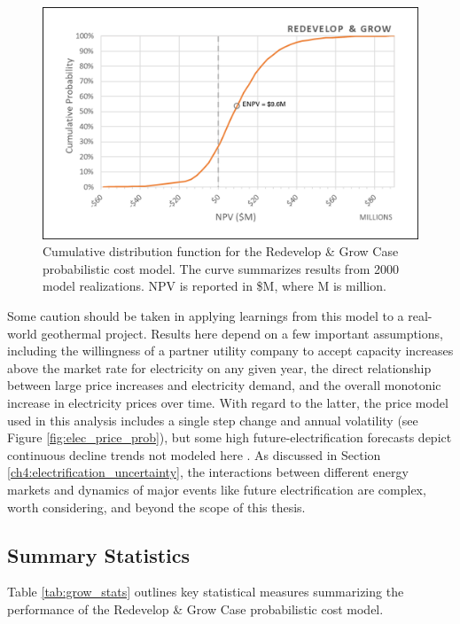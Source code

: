 \begin{figure}[!htp]
\centering
\includegraphics[width=.85\textwidth]{templates/images/Figure-Grow_Case_CDF.png}
\caption[Redevelop \& Grow Case CDF]{Cumulative distribution function for the Redevelop \& Grow Case probabilistic cost model. The curve summarizes results from 2000 model realizations. NPV is reported in \$M, where M is million.}
\label{fig:grow_case_cdf}
\end{figure}

Some caution should be taken in applying learnings from this model to a real-world geothermal project. Results here depend on a few important assumptions, including the willingness of a partner utility company to accept capacity increases above the market rate for electricity on any given year, the direct relationship between large price increases and electricity demand, and the overall monotonic increase in electricity prices over time. With regard to the latter, the price model used in this analysis includes a single step change and annual volatility (see Figure \ref{fig:elec_price_prob}), but some high future-electrification forecasts depict continuous decline trends not modeled here \citep{murphy_electrification_2021}. As discussed in Section \ref{ch4:electrification_uncertainty}, the interactions between different energy markets and dynamics of major events like future electrification are complex, worth considering, and beyond the scope of this thesis. 

\subsection{Summary Statistics}\label{ch6:grow_stats}

Table \ref{tab:grow_stats} outlines key statistical measures summarizing the performance of the Redevelop \& Grow Case probabilistic cost model.

